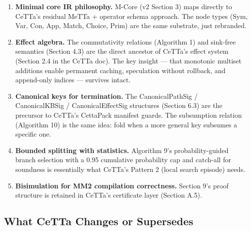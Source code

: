 \documentclass[11pt]{article}
\begin{document}
\begin{enumerate}
    \item \textbf{Minimal core IR philosophy.} M-Core (v2 Section 3) maps directly to CeTTa's residual MeTTa + operator schema approach. The node types (Sym, Var, Con, App, Match, Choice, Prim) are the same substrate, just rebranded.

    \item \textbf{Effect algebra.} The commutativity relations (Algorithm 1) and sink-free semantics (Section 4.3) are the direct ancestor of CeTTa's effect system (Section 2.4 in the CeTTa doc). The key insight --- that monotonic multiset additions enable permanent caching, speculation without rollback, and append-only indices --- survives intact.

    \item \textbf{Canonical keys for termination.} The CanonicalPathSig / CanonicalKBSig / CanonicalEffectSig structures (Section 6.3) are the precursor to CeTTa's CettaPack manifest guards. The subsumption relation (Algorithm 10) is the same idea: fold when a more general key subsumes a specific one.

    \item \textbf{Bounded splitting with statistics.} Algorithm 9's probability-guided branch selection with a 0.95 cumulative probability cap and catch-all for soundness is essentially what CeTTa's Pattern 2 (local search episode) needs.

    \item \textbf{Bisimulation for MM2 compilation correctness.} Section 9's proof structure is retained in CeTTa's certificate layer (Section A.5).
\end{enumerate}

\subsection{What CeTTa Changes or Supersedes}
\end{document}
